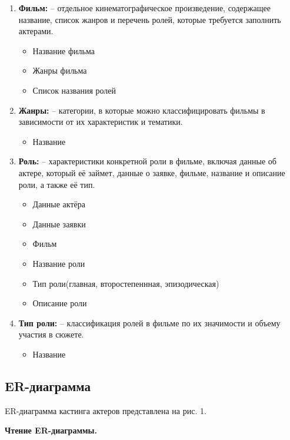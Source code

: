 \documentclass[11pt,a4paper,final]{article} %
\begin{document}
\begin{enumerate}
\item \textbf{Фильм:} -- отдельное кинематографическое произведение, содержащее название, список жанров и перечень ролей, которые требуется заполнить актерами.
\begin{itemize}
	\item Название фильма 
	\item Жанры фильма 
	\item Список названия ролей 
\end{itemize}

\item \textbf{Жанры:} -- категории, в которые можно классифицировать фильмы в зависимости от их характеристик и тематики.
\begin{itemize}
	\item Название  

\end{itemize}

\item \textbf{Роль:} -- характеристики конкретной роли в фильме, включая данные об актере, который её займет, данные о заявке, фильме, название и описание роли, а также её тип.
\begin{itemize}
	\item Данные актёра
	\item Данные заявки 
	\item Фильм 
	\item Название роли
	\item Тип роли(главная, второстепеннная, эпизодическая)
	\item Описание роли 
\end{itemize}

\item \textbf{Тип роли:} --  классификация ролей в фильме по их значимости и объему участия в сюжете. 
\begin{itemize}
	\item Название  
\end{itemize}

\end{enumerate}
 

\subsection {ER-диаграмма}
\par ER-диаграмма кастинга актеров представлена на рис. 1.
\par \textbf{Чтение ER-диаграммы.}
\end{document}
